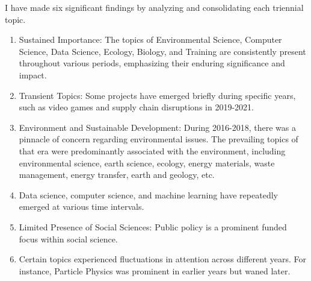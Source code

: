 I have made six significant findings by analyzing and consolidating each triennial topic. 

\begin{enumerate}

  \item Sustained Importance: The topics of Environmental Science, Computer Science, Data Science, Ecology, Biology, and Training are consistently present throughout various periods, emphasizing their enduring significance and impact.

  \item Transient Topics: Some projects have emerged briefly during specific years, such as video games and supply chain disruptions in 2019-2021.

  \item Environment and Sustainable Development: During 2016-2018, there was a pinnacle of concern regarding environmental issues. The prevailing topics of that era were predominantly associated with the environment, including environmental science, earth science, ecology, energy materials, waste management, energy transfer, earth and geology, etc.

  \item Data science, computer science, and machine learning have repeatedly emerged at various time intervals.

  \item Limited Presence of Social Sciences: Public policy is a prominent funded focus within social science.

  \item Certain topics experienced fluctuations in attention across different years. For instance, Particle Physics was prominent in earlier years but waned later.\\
  
\end{enumerate}

